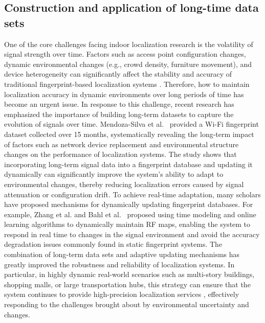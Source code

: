 \documentclass[12pt,a4paper]{article}
\numberwithin{equation}{section}
\begin{document}
\subsection{Construction and application of long-time data sets}
One of the core challenges facing indoor localization research is the volatility of signal strength over time. Factors such as access point configuration changes, dynamic environmental changes (e.g., crowd density, furniture movement), and device heterogeneity can significantly affect the stability and accuracy of traditional fingerprint-based localization systems \cite{liu2020survey}. Therefore, how to maintain localization accuracy in dynamic environments over long periods of time has become an urgent issue.
In response to this challenge, recent research has emphasized the importance of building long-term datasets to capture the evolution of signals over time. Mendoza-Silva et al.\ \cite{data3010003} provided a Wi-Fi fingerprint dataset collected over 15 months, systematically revealing the long-term impact of factors such as network device replacement and environmental structure changes on the performance of localization systems. The study shows that incorporating long-term signal data into a fingerprint database and updating it dynamically can significantly improve the system's ability to adapt to environmental changes, thereby reducing localization errors caused by signal attenuation or configuration drift.
To achieve real-time adaptation, many scholars have proposed mechanisms for dynamically updating fingerprint databases. For example, Zhang et al. \cite{zhang2019dynamic} and Bahl et al.\ \cite{10.1145/2568225.2568272} proposed using time modeling and online learning algorithms to dynamically maintain RF maps, enabling the system to respond in real time to changes in the signal environment and avoid the accuracy degradation issues commonly found in static fingerprint systems.
The combination of long-term data sets and adaptive updating mechanisms has greatly improved the robustness and reliability of localization systems. In particular, in highly dynamic real-world scenarios such as multi-story buildings, shopping malls, or large transportation hubs, this strategy can ensure that the system continues to provide high-precision localization services \cite{sen2013you, shang2015enhancing}, effectively responding to the challenges brought about by environmental uncertainty and changes.
\end{document}
